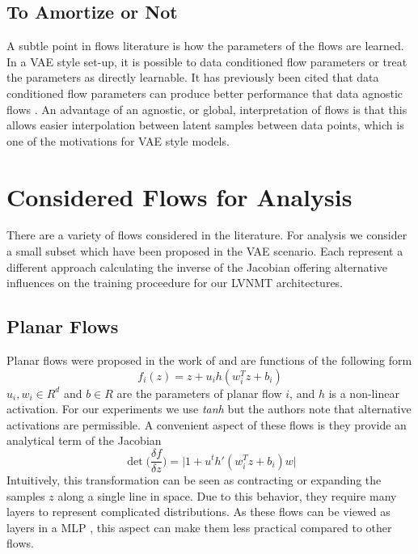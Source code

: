 \subsection{To Amortize or Not}

A subtle point in flows literature is how the parameters of the flows are learned. In a \ac{VAE} style set-up, it is possible to data conditioned flow parameters or treat the parameters as directly learnable. It has previously been cited that data conditioned flow parameters can produce better performance that data agnostic flows \cite{vdberg2018sylvester}. An advantage of an agnostic, or global, interpretation of flows is that this allows easier interpolation between latent samples between data points, which is one of the motivations for \ac{VAE} style models. 


\section{Considered Flows for Analysis}

There are a variety of flows considered in the literature. For analysis we consider a small subset which have been proposed in the \ac{VAE} scenario. Each represent a different approach calculating the inverse of the Jacobian offering alternative influences on the training proceedure for our \ac{LVNMT} architectures. 

\subsection{Planar Flows}

Planar flows were proposed in the work of \citet{rezende2015VIwithNF} and are functions of the following form
\begin{equation}
	f_{i}(z) = z + u_{i} h(w_{i}^{T} z + b_{i})
\end{equation}
$u_{i}, w_{i} \in R^{d}$ and $b \in R$ are the parameters of planar flow $i$, and $h$ is a non-linear activation. For our experiments we use \textit{tanh} but the authors note that alternative activations are permissible. A convenient aspect of these flows is they provide an analytical term of the Jacobian
\begin{equation}
	\det \bigg( \frac{\delta f}{\delta z} \bigg) = \bigg| 1 + u^{t} h'(w_{i}^{T} z + b_{i})w \bigg|
\end{equation} 
Intuitively, this transformation can be seen as contracting or expanding the samples $z$ along a single line in space.  Due to this behavior, they require many layers to represent complicated distributions. %
As these flows can be viewed as layers in a \ac{MLP} \cite{kingma2016IAF}, this aspect can make them less practical compared to other flows. 

